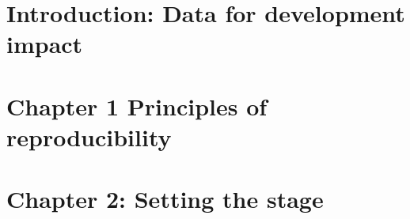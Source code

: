%
%
%
%




\cleardoublepage
\chapter{Introduction: Data for development impact} %





\chapter{Chapter 1 Principles of reproducibility}
\label{ch:1}





\chapter{Chapter 2: Setting the stage}
\label{ch:2}

% 





